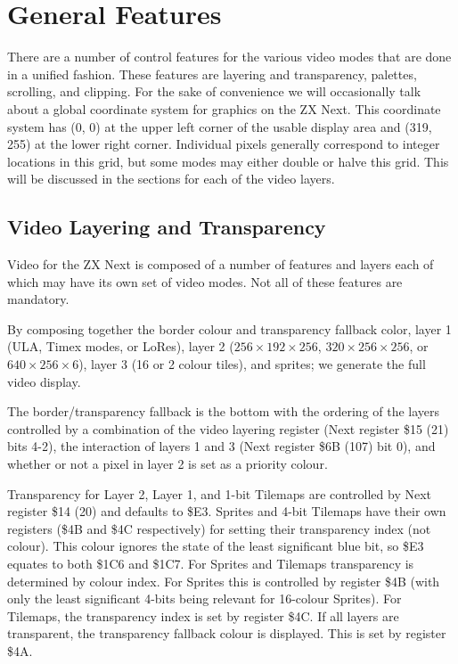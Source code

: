 \section{General Features}
There are a number of control features for the various video modes
that are done in a unified fashion. These features are layering and
transparency, palettes, scrolling, and clipping. For the sake of
convenience we will occasionally talk about a global coordinate system
for graphics on the ZX Next. This coordinate system has (0, 0) at the
upper left corner of the usable display area and (319, 255) at the
lower right corner. Individual pixels generally correspond to integer
locations in this grid, but some modes may either double or halve this
grid. This will be discussed in the sections for each of the video
layers.

\subsection{Video Layering and Transparency}
Video for the ZX Next is composed of a number of features and layers
each of which may have its own set of video modes. Not all of these
features are mandatory.

By composing together the border colour and transparency fallback
color, layer 1 (ULA, Timex modes, or LoRes), layer 2
($256\times192\times256$, $320\times256\times256$, or
$640\times256\times6$), layer 3 (16 or 2 colour tiles), and sprites;
we generate the full video display.

The border/transparency fallback is the bottom with the ordering of
the layers controlled by a combination of the video layering register
(Next register \$15 (21) bits 4-2), the interaction of layers 1 and 3
(Next register \$6B (107) bit 0), and whether or not a pixel in layer
2 is set as a priority colour.



Transparency for Layer 2, Layer 1, and 1-bit Tilemaps are
controlled by Next register \$14 (20) and defaults to \$E3. Sprites
and 4-bit Tilemaps have their own registers (\$4B and \$4C
respectively) for setting their transparency index (not colour). This
colour ignores the state of the least significant blue bit, so \$E3
equates to both \$1C6 and \$1C7. For Sprites and Tilemaps transparency
is determined by colour index. For Sprites this is controlled by
register \$4B (with only the least significant 4-bits being relevant
for 16-colour Sprites). For Tilemaps, the transparency index is set by
register \$4C. If all layers are transparent, the transparency
fallback colour is displayed. This is set by register \$4A.

